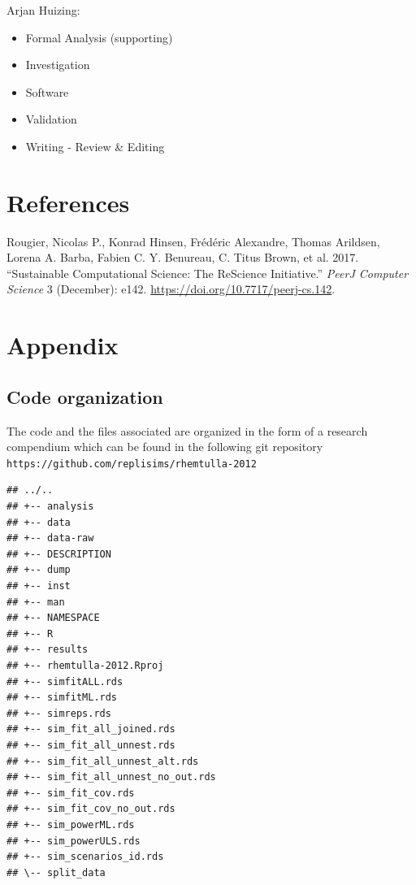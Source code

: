 \documentclass[10,a4paperpaper,]{article}
\newenvironment{CSLReferences}%
  {}%
  {\par}
\begin{document}
Arjan Huizing:

\begin{itemize}
\tightlist
\item
  Formal Analysis (supporting)\\
\item
  Investigation\\
\item
  Software
\item
  Validation\\
\item
  Writing - Review \& Editing
\end{itemize}

\newpage

\section*{References}
\begingroup
\hphantom{x}
\setlength{\parindent}{-0.5in}
\setlength{\leftskip}{0.5in}

\hypertarget{refs}{}
\begin{CSLReferences}{1}{0}
\leavevmode{}%
Rougier, Nicolas P., Konrad Hinsen, Frédéric Alexandre, Thomas Arildsen,
Lorena A. Barba, Fabien C. Y. Benureau, C. Titus Brown, et al. 2017.
{``Sustainable Computational Science: The {ReScience} Initiative.''}
\emph{PeerJ Computer Science} 3 (December): e142.
\url{https://doi.org/10.7717/peerj-cs.142}.

\end{CSLReferences}

\FloatBarrier
\endgroup
\newpage

\section*{Appendix}

\subsection{Code organization}

The code and the files associated are organized in the form of a
research compendium which can be found in the following git repository
\texttt{https://github.com/replisims/rhemtulla-2012}

\begin{verbatim}
## ../..
## +-- analysis
## +-- data
## +-- data-raw
## +-- DESCRIPTION
## +-- dump
## +-- inst
## +-- man
## +-- NAMESPACE
## +-- R
## +-- results
## +-- rhemtulla-2012.Rproj
## +-- simfitALL.rds
## +-- simfitML.rds
## +-- simreps.rds
## +-- sim_fit_all_joined.rds
## +-- sim_fit_all_unnest.rds
## +-- sim_fit_all_unnest_alt.rds
## +-- sim_fit_all_unnest_no_out.rds
## +-- sim_fit_cov.rds
## +-- sim_fit_cov_no_out.rds
## +-- sim_powerML.rds
## +-- sim_powerULS.rds
## +-- sim_scenarios_id.rds
## \-- split_data
\end{verbatim}
\end{document}

